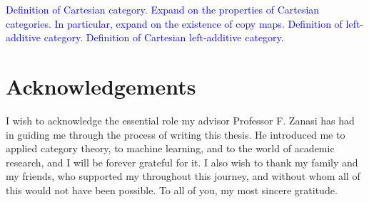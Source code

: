 \documentclass[12pt,a4paper,openright,twoside]{report}
\theoremstyle{plain}
\theoremstyle{definition}
\begin{document}
\textcolor{blue}{Definition of Cartesian category.}
\textcolor{blue}{Expand on the properties of Cartesian categories. In particular, expand on the existence of copy maps.}
\textcolor{blue}{Definition of left-additive category.}
\textcolor{blue}{Definition of Cartesian left-additive category.}

























\chapter*{Acknowledgements}

\thispagestyle{empty}

I wish to acknowledge the essential role my advisor Professor F. Zanasi has had in guiding me through the process of writing this thesis. He introduced me to applied category theory, to machine learning, and to the world of academic research, and I will be forever grateful for it. I also wish to thank my family and my friends, who supported my throughout this journey, and without whom all of this would not have been possible. To all of you, my most sincere gratitude.
\end{document}
